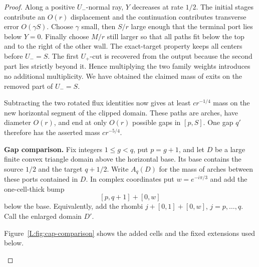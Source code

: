 \documentclass[11pt]{article}
\numberwithin{equation}{section}
\theoremstyle{definition}\newtheorem{definition}[theorem]{Definition}
\theoremstyle{remark}\newtheorem{remark}[theorem]{Remark}
\begin{document}
\begin{proof}
Along a positive $U_-$-normal ray, $Y$ decreases at rate $1/2$.
The initial stages contribute an $O(r)$ displacement and the
continuation contributes transverse error $O(\gamma S)$.
Choose $\gamma$ small, then $S/r$ large enough that the terminal
port lies below $Y=0$.  Finally choose $M/r$ still larger so that
all paths fit below the top and to the right of the other wall.
The exact-target property keeps all centers before $U_-=S$.
The first $U_+$-cut is recovered from the output because the second
part lies strictly beyond it.  Hence multiplying the two family
weights introduces no additional multiplicity.  We have obtained
the claimed mass of exits on the removed part of $U_-=S$.

Subtracting the two rotated flux identities now gives at least
$cr^{-1/4}$ mass on the new horizontal segment of the clipped domain.
These paths are arches, have diameter $O(r)$, and end at only $O(r)$
possible gaps in $[p,S]$.  One gap $q'$ therefore has the asserted
mass $cr^{-5/4}$.

\medskip\noindent\textbf{Gap comparison.}
\label{L:cap-gap-comparison}
Fix integers $1\le g<q$, put $p=g+1$, and let $D$ be a large finite
convex triangle domain above the horizontal base.  Its base contains
the source $1/2$ and the target $q+1/2$.  Write $A_q(D)$ for the
mass of arches between these ports contained in $D$.  In complex
coordinates put $w=e^{-i\pi/3}$ and add the one-cell-thick bump
\[
 [p,q+1]+[0,w]
\]
below the base.  Equivalently, add the rhombi
$j+[0,1]+[0,w]$, $j=p,\ldots,q$.  Call the enlarged domain $D'$.

Figure~\ref{L:fig:cap-comparison} shows the added cells and the fixed
extensions used below.
\begin{figure}[htbp]
\centering{}


\end{figure}
\end{proof}
\end{document}
